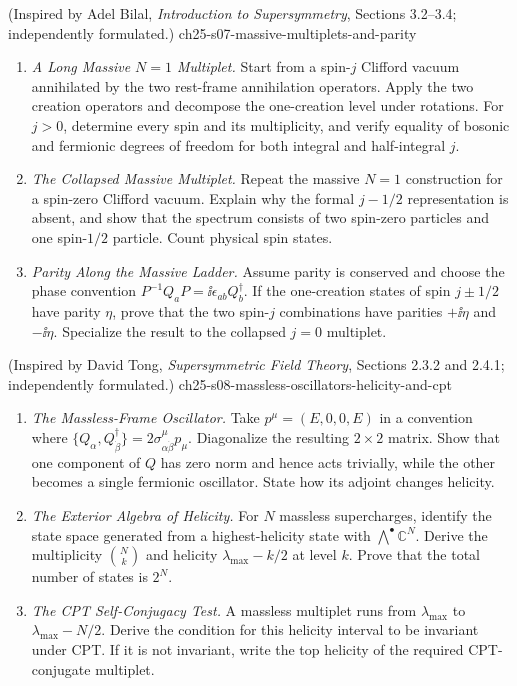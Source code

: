 \begin{enumerate}
    {(Inspired by Adel Bilal, \emph{Introduction to Supersymmetry}, Sections 3.2--3.4; independently formulated.)}
    {ch25-s07-massive-multiplets-and-parity}
  \begin{enumerate}
    \item \emph{A Long Massive \(N=1\) Multiplet.}
    Start from a spin-\(j\) Clifford vacuum annihilated by the two rest-frame
      annihilation operators.  Apply the two creation operators and decompose
      the one-creation level under rotations.  For \(j>0\), determine every spin
      and its multiplicity, and verify equality of bosonic and fermionic
      degrees of freedom for both integral and half-integral \(j\).
    \item \emph{The Collapsed Massive Multiplet.}
    Repeat the massive \(N=1\) construction for a spin-zero Clifford vacuum.
      Explain why the formal \(j-1/2\) representation is absent, and show that
      the spectrum consists of two spin-zero particles and one spin-\(1/2\)
      particle.  Count physical spin states.
    \item \emph{Parity Along the Massive Ladder.}
    Assume parity is conserved and choose the phase convention
      \(P^{-1}Q_aP=\ii\epsilon_{ab}Q_b^\dagger\).  If the one-creation states of
      spin \(j\pm1/2\) have parity \(\eta\), prove that the two spin-\(j\)
      combinations have parities \(+\ii\eta\) and \(-\ii\eta\).  Specialize the
      result to the collapsed \(j=0\) multiplet.
  \end{enumerate}

    {(Inspired by David Tong, \emph{Supersymmetric Field Theory}, Sections 2.3.2 and 2.4.1; independently formulated.)}
    {ch25-s08-massless-oscillators-helicity-and-cpt}
  \begin{enumerate}
    \item \emph{The Massless-Frame Oscillator.}
    Take \(p^\mu=(E,0,0,E)\) in a convention where
      \(\{Q_\alpha,Q^\dagger_{\dot\beta}\}
      =2\sigma^\mu_{\alpha\dot\beta}p_\mu\).  Diagonalize the resulting
      \(2\times2\) matrix.  Show that one component of \(Q\) has zero norm and
      hence acts trivially, while the other becomes a single fermionic
      oscillator.  State how its adjoint changes helicity.
    \item \emph{The Exterior Algebra of Helicity.}
    For \(N\) massless supercharges, identify the state space generated from a
      highest-helicity state with \(\bigwedge^\bullet\mathbb C^N\).
      Derive the multiplicity \(\binom Nk\) and helicity
      \(\lambda_{\max}-k/2\) at level \(k\).  Prove that the total number of
      states is \(2^N\).
    \item \emph{The CPT Self-Conjugacy Test.}
    A massless multiplet runs from \(\lambda_{\max}\) to
      \(\lambda_{\max}-N/2\).  Derive the condition for this helicity interval
      to be invariant under CPT.  If it is not invariant, write the top
      helicity of the required CPT-conjugate multiplet.
  \end{enumerate}


\end{enumerate}
